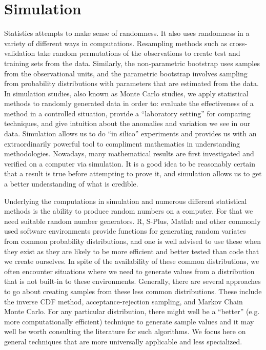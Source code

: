 \chapter{Simulation}

Statistics attempts to make sense of randomness.  It also uses
randomness in a variety of different ways in computations.  Resampling
methods such as cross-validation take random permutations of the
observations to create test and training sets from the data.
Similarly, the non-parametric bootstrap uses samples from the
observational units, and the parametric bootstrap involves sampling
from probability distributions with parameters that are estimated from
the data.  In simulation studies, also known as Monte Carlo studies,
we apply statistical methods to randomly generated data in order to:
evaluate the effectiveness of a method in a controlled situation,
provide a ``laboratory setting'' for comparing techniques, and give
intuition about the anomalies and variation we see in our data.
Simulation allows us to do ``in silico'' experiments and provides us
with an extraordinarily powerful tool to compliment mathematics in
understanding methodologies.  Nowadays, many mathematical results are
first investigated and verified on a computer via simulation.  It is a
good idea to be reasonably certain that a result is true before
attempting to prove it, and simulation allows us to get a better
understanding of what is credible.


Underlying the computations in simulation and numerous different
statistical methods is the ability to produce random numbers on a
computer. For that we need suitable random number generators.  R,
S-Plus, Matlab and other commonly used software environments provide
functions for generating random variates from common probability
distributions, and one is well advised to use these when they exist as
they are likely to be more efficient and better tested than code that
we create ourselves.  In spite of the availability of these common
distributions, we often encounter situations where we need to generate
values from a distribution that is not built-in to these environments.
Generally, there are several approaches to go about creating samples
from these less common distributions.  These include the inverse CDF
method, acceptance-rejection sampling, and Markov Chain Monte Carlo.
For any particular distribution, there might well be a ``better''
(e.g. more computationally efficient) technique to generate sample
values and it may well be worth consulting the literature for such
algorithms.  We focus here on general techniques that are
more universally applicable and less specialized.


